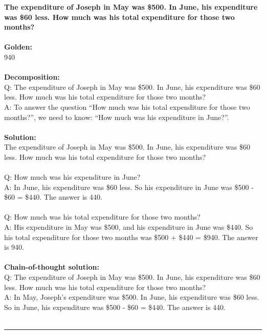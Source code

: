 \noindent
\textbf{The expenditure of Joseph in May was \$500. In June, his expenditure was \$60 less. How much was his total expenditure for those two months?} \\
 \\
\textbf{Golden:} \\
940 \\
 \\
\textbf{Decomposition:} \\
Q: The expenditure of Joseph in May was \$500. In June, his expenditure was \$60 less. How much was his total expenditure for those two months? \\
A: To answer the question ``How much was his total expenditure for those two months?'', we need to know: ``How much was his expenditure in June?''. \\
 \\
\textbf{Solution:} \\
The expenditure of Joseph in May was \$500. In June, his expenditure was \$60 less. How much was his total expenditure for those two months? \\
 \\
Q: How much was his expenditure in June? \\
A: In June, his expenditure was \$60 less. So his expenditure in June was \$500 - \$60 = \$440. The answer is 440. \\
 \\
Q: How much was his total expenditure for those two months? \\
A: His expenditure in May was \$500, and his expenditure in June was \$440. So his total expenditure for those two months was \$500 + \$440 = \$940. The answer is 940. \\
 \\
\textbf{Chain-of-thought solution:} \\
Q: The expenditure of Joseph in May was \$500. In June, his expenditure was \$60 less. How much was his total expenditure for those two months? \\
A: In May, Joseph's expenditure was \$500. In June, his expenditure was \$60 less. So in June, his expenditure was \$500 - \$60 = \$440. The answer is 440. \\
 \\
\hrule \bigskip

